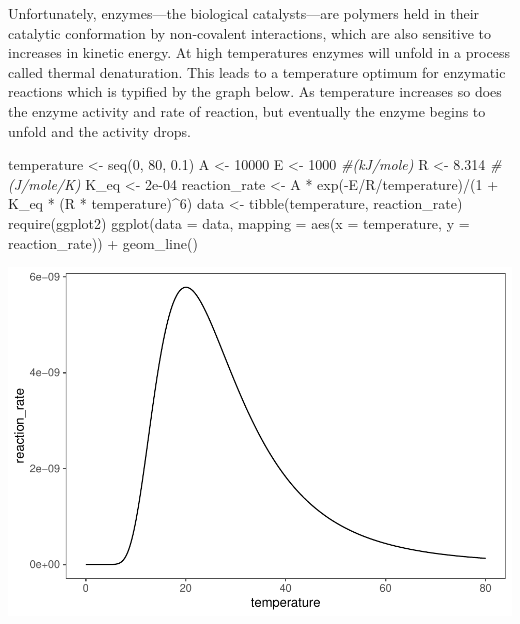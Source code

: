 \documentclass[
]{article}
\newenvironment{Shaded}{\begin{snugshade}}{\end{snugshade}}
\newcommand{\AttributeTok}[1]{\textcolor[rgb]{0.77,0.63,0.00}{#1}}
\newcommand{\CommentTok}[1]{\textcolor[rgb]{0.56,0.35,0.01}{\textit{#1}}}
\newcommand{\DecValTok}[1]{\textcolor[rgb]{0.00,0.00,0.81}{#1}}
\newcommand{\FloatTok}[1]{\textcolor[rgb]{0.00,0.00,0.81}{#1}}
\newcommand{\FunctionTok}[1]{\textcolor[rgb]{0.00,0.00,0.00}{#1}}
\newcommand{\NormalTok}[1]{#1}
\newcommand{\OtherTok}[1]{\textcolor[rgb]{0.56,0.35,0.01}{#1}}
\newcommand{\SpecialCharTok}[1]{\textcolor[rgb]{0.00,0.00,0.00}{#1}}
\begin{document}
Unfortunately, enzymes---the biological catalysts---are polymers held in their catalytic conformation by non-covalent interactions, which are also sensitive to increases in kinetic energy. At high temperatures enzymes will unfold in a process called thermal denaturation. This leads to a temperature optimum for enzymatic reactions which is typified by the graph below. As temperature increases so does the enzyme activity and rate of reaction, but eventually the enzyme begins to unfold and the activity drops.

\begin{Shaded}
\begin{Highlighting}[]
\NormalTok{temperature }\OtherTok{\textless{}{-}} \FunctionTok{seq}\NormalTok{(}\DecValTok{0}\NormalTok{, }\DecValTok{80}\NormalTok{, }\FloatTok{0.1}\NormalTok{)}
\NormalTok{A }\OtherTok{\textless{}{-}} \DecValTok{10000}
\NormalTok{E }\OtherTok{\textless{}{-}} \DecValTok{1000}  \CommentTok{\#(kJ/mole)}
\NormalTok{R }\OtherTok{\textless{}{-}} \FloatTok{8.314}  \CommentTok{\#(J/mole/K)}
\NormalTok{K\_eq }\OtherTok{\textless{}{-}} \FloatTok{2e{-}04}
\NormalTok{reaction\_rate }\OtherTok{\textless{}{-}}\NormalTok{ A }\SpecialCharTok{*} \FunctionTok{exp}\NormalTok{(}\SpecialCharTok{{-}}\NormalTok{E}\SpecialCharTok{/}\NormalTok{R}\SpecialCharTok{/}\NormalTok{temperature)}\SpecialCharTok{/}\NormalTok{(}\DecValTok{1} \SpecialCharTok{+}\NormalTok{ K\_eq }\SpecialCharTok{*} 
\NormalTok{    (R }\SpecialCharTok{*}\NormalTok{ temperature)}\SpecialCharTok{\^{}}\DecValTok{6}\NormalTok{)}
\NormalTok{data }\OtherTok{\textless{}{-}} \FunctionTok{tibble}\NormalTok{(temperature, reaction\_rate)}
\FunctionTok{require}\NormalTok{(ggplot2)}
\FunctionTok{ggplot}\NormalTok{(}\AttributeTok{data =}\NormalTok{ data, }\AttributeTok{mapping =} \FunctionTok{aes}\NormalTok{(}\AttributeTok{x =}\NormalTok{ temperature, }
    \AttributeTok{y =}\NormalTok{ reaction\_rate)) }\SpecialCharTok{+} \FunctionTok{geom\_line}\NormalTok{()}
\end{Highlighting}
\end{Shaded}

\includegraphics{Bioprocess_Engineering_files/figure-latex/unnamed-chunk-5-1.pdf}
\end{document}

